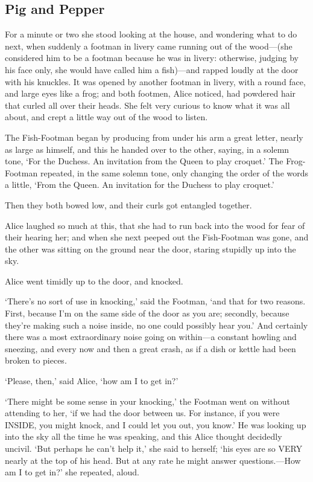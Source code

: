 \documentclass[12pt]{book}
\begin{document}
\begin{Parallel}[p]{}{}
{\section{Pig and Pepper}

For a minute or two she stood looking at the house, and wondering what to do next, when suddenly a footman in livery came running out of the wood—(she considered him to be a footman because he was in livery: otherwise, judging by his face only, she would have called him a fish)—and rapped loudly at the door with his knuckles. It was opened by another footman in livery, with a round face, and large eyes like a frog; and both footmen, Alice noticed, had powdered hair that curled all over their heads. She felt very curious to know what it was all about, and crept a little way out of the wood to listen.

The Fish-Footman began by producing from under his arm a great letter, nearly as large as himself, and this he handed over to the other, saying, in a solemn tone, ‘For the Duchess. An invitation from the Queen to play croquet.’ The Frog-Footman repeated, in the same solemn tone, only changing the order of the words a little, ‘From the Queen. An invitation for the Duchess to play croquet.’

Then they both bowed low, and their curls got entangled together.

Alice laughed so much at this, that she had to run back into the wood for fear of their hearing her; and when she next peeped out the Fish-Footman was gone, and the other was sitting on the ground near the door, staring stupidly up into the sky.

Alice went timidly up to the door, and knocked.

‘There’s no sort of use in knocking,’ said the Footman, ‘and that for two reasons. First, because I’m on the same side of the door as you are; secondly, because they’re making such a noise inside, no one could possibly hear you.’ And certainly there was a most extraordinary noise going on within—a constant howling and sneezing, and every now and then a great crash, as if a dish or kettle had been broken to pieces.

‘Please, then,’ said Alice, ‘how am I to get in?’

‘There might be some sense in your knocking,’ the Footman went on without attending to her, ‘if we had the door between us. For instance, if you were INSIDE, you might knock, and I could let you out, you know.’ He was looking up into the sky all the time he was speaking, and this Alice thought decidedly uncivil. ‘But perhaps he can’t help it,’ she said to herself; ‘his eyes are so VERY nearly at the top of his head. But at any rate he might answer questions.—How am I to get in?’ she repeated, aloud.

}
\end{Parallel}
\end{document}
